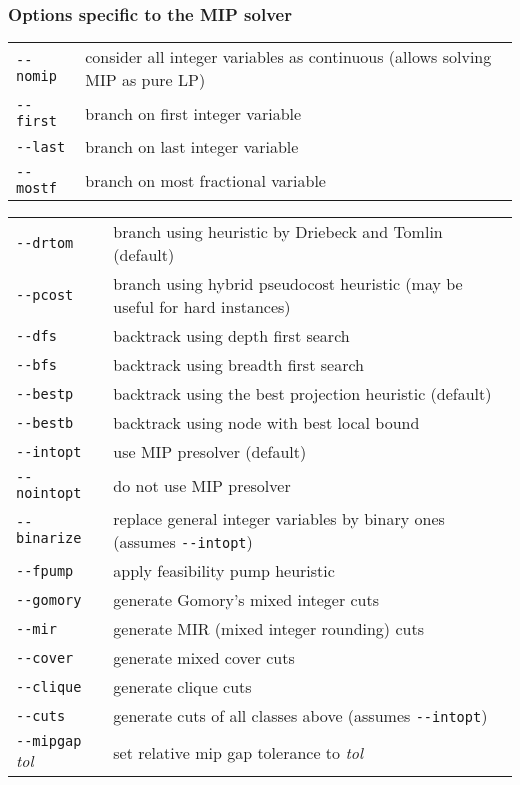 \subsubsection*{Options specific to the MIP solver}

\noindent
\begin{tabular}{@{}p{30mm}p{92.3mm}@{}}
\verb|--nomip|    &  consider all integer variables as continuous
                     (allows solving MIP as pure LP) \\
\verb|--first|    &  branch on first integer variable \\
\verb|--last|     &  branch on last integer variable \\
\verb|--mostf|    &  branch on most fractional variable \\
\end{tabular}

\noindent
\begin{tabular}{@{}p{30mm}p{92.3mm}@{}}
\verb|--drtom|    &  branch using heuristic by Driebeck and Tomlin
                     (default) \\
\verb|--pcost|    &  branch using hybrid pseudocost heuristic (may be
                     useful for hard instances) \\
\verb|--dfs|      &  backtrack using depth first search \\
\verb|--bfs|      &  backtrack using breadth first search \\
\verb|--bestp|    &  backtrack using the best projection heuristic
                     (default) \\
\verb|--bestb|    &  backtrack using node with best local bound \\
\verb|--intopt|   &  use MIP presolver (default)\\
\verb|--nointopt| &  do not use MIP presolver\\
\verb|--binarize| &  replace general integer variables by binary ones
                     (assumes \verb|--intopt|)\\
\verb|--fpump|    & apply feasibility pump heuristic\\
\verb|--gomory|   &  generate Gomory's mixed integer cuts\\
\verb|--mir|      &  generate MIR (mixed integer rounding) cuts\\
\verb|--cover|    &  generate mixed cover cuts\\
\verb|--clique|   &  generate clique cuts\\
\verb|--cuts|     &  generate cuts of all classes above (assumes
                     \verb|--intopt|)\\
\verb|--mipgap| {\it tol}
                  & set relative mip gap tolerance to {\it tol}\\
\end{tabular}

